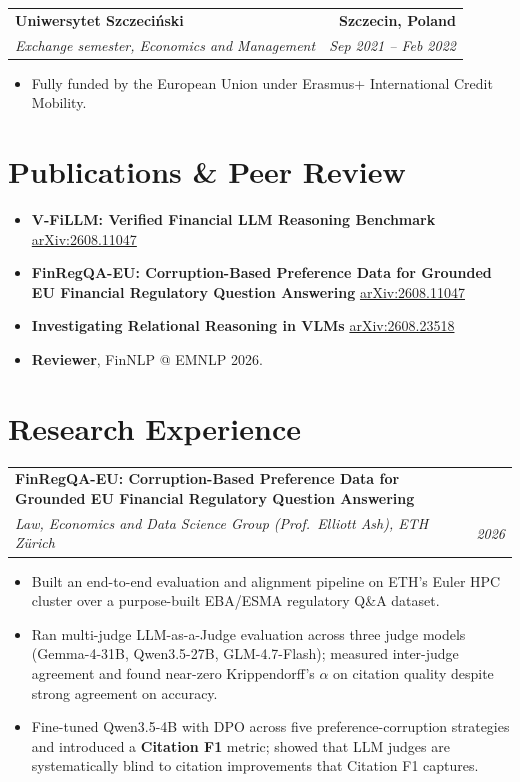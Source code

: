 \documentclass[10.5pt,a4paper]{article}
\makeatletter
\newcommand{\entry}[4]{%
  \noindent\begin{tabularx}{\linewidth}{@{}Xr@{}}
    \textbf{#1} & \textbf{#3} \\
    \textit{#2} & \textit{#4} \\
  \end{tabularx}\vspace{0.15em}
}
\newenvironment{bullets}
  {\begin{itemize}[leftmargin=1.1em,itemsep=0.12em,topsep=0.18em,parsep=0pt]}
  {\end{itemize}}
\makeatother
\begin{document}
\entry{Uniwersytet Szczeciński}{Exchange semester, Economics and Management}{Szczecin, Poland}{Sep 2021 -- Feb 2022}
\begin{bullets}
  \item Fully funded by the European Union under Erasmus+ International Credit Mobility.
\end{bullets}

\section{Publications \& Peer Review}
\begin{bullets}
  \item \textbf{V-FiLLM: Verified Financial LLM Reasoning Benchmark}
        \hfill {\small\href{https://arxiv.org/abs/2608.11047}{arXiv:2608.11047}}
  \item \textbf{FinRegQA-EU: Corruption-Based Preference Data for Grounded EU Financial Regulatory Question Answering}
        \hfill {\small\href{https://arxiv.org/abs/2609.36856}{arXiv:2608.11047}}

  \item \textbf{Investigating Relational Reasoning in VLMs}
        \hfill {\small\href{https://arxiv.org/abs/2608.23518}{arXiv:2608.23518}}
  \item \textbf{Reviewer}, FinNLP @ EMNLP 2026.
\end{bullets}

\section{Research Experience}

\entry{FinRegQA-EU: Corruption-Based Preference Data for Grounded EU Financial Regulatory Question Answering}{Law, Economics and Data Science Group (Prof.\ Elliott Ash), ETH Zürich}{}{2026}
\begin{bullets}
  \item Built an end-to-end evaluation and alignment pipeline on ETH's Euler HPC
        cluster over a purpose-built EBA/ESMA regulatory Q\&A dataset.
  \item Ran multi-judge LLM-as-a-Judge evaluation across three judge models
        (Gemma-4-31B, Qwen3.5-27B, GLM-4.7-Flash); measured inter-judge agreement and found
        near-zero Krippendorff's $\alpha$ on citation quality despite strong agreement on accuracy.
  \item Fine-tuned Qwen3.5-4B with DPO across five preference-corruption strategies and introduced a
        \textbf{Citation F1} metric; showed that LLM judges are systematically blind to citation
        improvements that Citation F1 captures.
\end{bullets}
\end{document}
